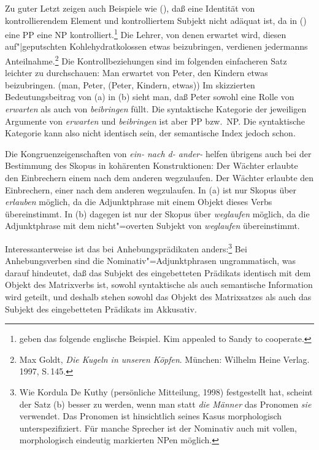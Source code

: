 Zu guter Letzt zeigen auch Beispiele wie (), daß eine Identität von kontrollierendem Element und kontrolliertem
Subjekt nicht adäquat ist, da in () eine PP eine NP kontrolliert.\footnote{
        \citet*[]{ps2} geben das folgende englische
        Beispiel.
        \ea
        Kim appealed to Sandy to cooperate.
        \zlast
}
\ea{}
Die Lehrer, von denen erwartet wird, diesen auf"|geputschten Kohlehydratkolossen etwas beizubringen,
verdienen jedermanns Anteilnahme.\footnote{
        Max Goldt, \emph{Die Kugeln in unseren Köpfen}. München: Wilhelm Heine Verlag. 1997, S.\,145.
}
\z
Die Kontrollbeziehungen sind im folgenden einfacheren Satz leichter zu durchschauen:
\eal
\ex Man erwartet von Peter, den Kindern etwas beizubringen.
\ex {}(man, Peter, (Peter, Kindern, etwas))
\zl
Im skizzierten Bedeutungsbeitrag von (a) in (b) sieht man, daß Peter sowohl eine Rolle
von \emph{erwarten} als auch von \emph{beibringen} füllt. Die syntaktische Kategorie der jeweiligen
Argumente von \emph{erwarten} und \emph{beibringen} ist aber PP bzw.\ NP. Die syntaktische Kategorie
kann also nicht identisch sein, der semantische Index jedoch schon.

Die Kongruenzeigenschaften von {\em ein- nach d- ander-\/} helfen übrigens auch
bei der Bestimmung des Skopus in kohärenten Konstruktionen:
\eal
\ex Der Wächter erlaubte den Einbrechern    einem     nach  dem anderen wegzulaufen.
\ex Der Wächter erlaubte den Einbrechern,   einer     nach  dem anderen wegzulaufen.
\zl
In (a) ist nur Skopus über \emph{erlauben} möglich, da die Adjunktphrase mit einem Objekt dieses Verbs
übereinstimmt. In (b) dagegen ist nur der Skopus über \emph{weglaufen} möglich, da die Adjunktphrase
mit dem nicht"=overten Subjekt von \emph{weglaufen} übereinstimmt.

Interessanterweise ist das bei Anhebungsprädikaten anders:\footnote{
       Wie Kordula De Kuthy (persönliche Mitteilung, 1998) festgestellt hat, scheint der Satz (b) besser zu werden,
       wenn man statt \emph{die Männer} das Pronomen \emph{sie} verwendet.
        \z
        Das Pronomen ist hinsichtlich seines Kasus morphologisch unterspezifiziert. Für manche Sprecher
        ist der Nominativ auch mit vollen, morphologisch eindeutig markierten NPen möglich.
}
\eal
{}
\zl
Bei Anhebungsverben sind die Nominativ"=Adjunktphrasen ungrammatisch, was darauf hindeutet,
daß das Subjekt des eingebetteten Prädikats identisch mit dem Objekt des Matrixverbs ist, \dash
sowohl syntaktische als auch semantische Information wird geteilt, und deshalb stehen sowohl das Objekt
des Matrixsatzes als auch das Subjekt des eingebetteten Prädikats im Akkusativ.

